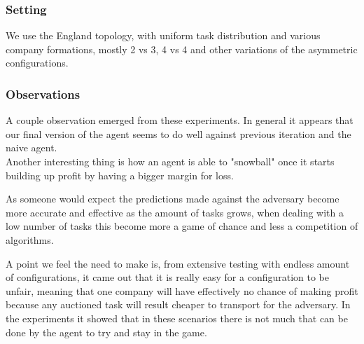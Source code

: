 \documentclass[11pt]{article}
\begin{document}
\subsubsection{Setting}
We use the England topology, with uniform task distribution and various company formations, mostly 2 vs 3, 4 vs 4 and other variations of the asymmetric configurations.

\subsubsection{Observations}
A couple observation emerged from these experiments. In general it appears that our final version of the agent seems to do well against previous iteration and the naive agent. \\
Another interesting thing is how an agent is able to "snowball" once it starts building up profit by having a bigger margin for loss.

As someone would expect the predictions made against the adversary become more accurate and effective as the amount of tasks grows, when dealing with a low number of tasks this become more a game of chance and less a competition of algorithms.

A point we feel the need to make is, from extensive testing with endless amount of configurations, it came out that it is really easy for a configuration to be unfair, meaning that one company will have effectively no chance of making profit because any auctioned task will result cheaper to transport for the adversary. In the experiments it showed that in these scenarios there is not much that can be done by the agent to try and stay in the game.
\end{document}
